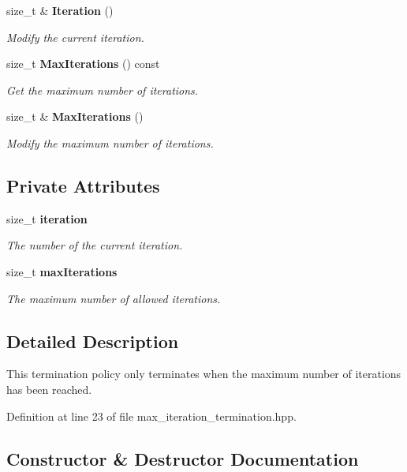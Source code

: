 \begin{DoxyCompactItemize}
size\+\_\+t \& {\bf Iteration} ()
\begin{DoxyCompactList}\small\item\em Modify the current iteration. \end{DoxyCompactList}\item 
size\+\_\+t {\bf Max\+Iterations} () const 
\begin{DoxyCompactList}\small\item\em Get the maximum number of iterations. \end{DoxyCompactList}\item 
size\+\_\+t \& {\bf Max\+Iterations} ()
\begin{DoxyCompactList}\small\item\em Modify the maximum number of iterations. \end{DoxyCompactList}\end{DoxyCompactItemize}
\subsection*{Private Attributes}
\begin{DoxyCompactItemize}
\item 
size\+\_\+t {\bf iteration}
\begin{DoxyCompactList}\small\item\em The number of the current iteration. \end{DoxyCompactList}\item 
size\+\_\+t {\bf max\+Iterations}
\begin{DoxyCompactList}\small\item\em The maximum number of allowed iterations. \end{DoxyCompactList}\end{DoxyCompactItemize}


\subsection{Detailed Description}
This termination policy only terminates when the maximum number of iterations has been reached. 

Definition at line 23 of file max\+\_\+iteration\+\_\+termination.\+hpp.



\subsection{Constructor \& Destructor Documentation}
